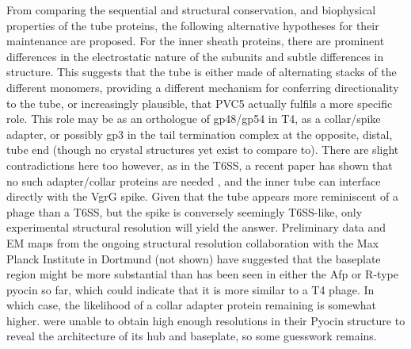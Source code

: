 From comparing the sequential and structural conservation, and biophysical properties of the tube proteins, the following alternative hypotheses for their maintenance are proposed. For the inner sheath proteins, there are prominent differences in the electrostatic nature of the subunits and subtle differences in structure. This suggests that the tube is either made of alternating stacks of the different monomers, providing a different mechanism for conferring directionality to the tube, or increasingly plausible, that PVC5 actually fulfils a more specific role. This role may be as an orthologue of gp48/gp54 in T4, as a collar/spike adapter, or possibly gp3 in the tail termination complex at the opposite, distal, tube end (though no crystal structures yet exist to compare to). There are slight contradictions here too however, as in the T6SS, a recent paper has shown that no such adapter/collar proteins are needed \citep{Renault2018}, and the inner tube can interface directly with the VgrG spike. Given that the tube appears more reminiscent of a phage than a T6SS, but the spike is conversely seemingly T6SS-like, only experimental structural resolution will yield the answer. Preliminary data and EM maps from the ongoing structural resolution collaboration with the Max Planck Institute in Dortmund (not shown) have suggested that the baseplate region might be more substantial than has been seen in either the Afp or R-type pyocin so far, which could indicate that it is more similar to a T4 phage. In which case, the likelihood of a collar adapter protein remaining is somewhat higher. \cite{Ge2015} were unable to obtain high enough resolutions in their Pyocin structure to reveal the architecture of its hub and baseplate, so some guesswork remains.

